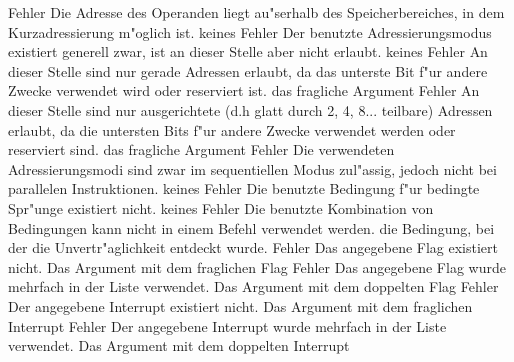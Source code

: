 \documentclass[12pt,a4paper,twoside]{report}
\begin{document}
\begin{description}
               {Fehler}
               {Die Adresse des Operanden liegt au"serhalb des
                Speicherbereiches, in dem Kurzadressierung m"oglich ist.}
               {keines}
               {Fehler}
               {Der benutzte Adressierungsmodus existiert
                generell zwar, ist an dieser Stelle aber nicht erlaubt.}
               {keines}
               {Fehler}
               {An dieser Stelle sind nur gerade Adressen erlaubt,
                da das unterste Bit f"ur andere Zwecke verwendet wird
                oder reserviert ist.}
               {das fragliche Argument}
               {Fehler}
               {An dieser Stelle sind nur ausgerichtete
                (d.h glatt durch 2, 4, 8... teilbare) Adressen erlaubt,
                da die untersten Bits f"ur andere Zwecke verwendet werden
                oder reserviert sind.}
               {das fragliche Argument}
               {Fehler}
               {Die verwendeten Adressierungsmodi
                sind zwar im sequentiellen Modus zul"assig, jedoch nicht
                bei parallelen Instruktionen.}
               {keines}
               {Fehler}
               {Die benutzte Bedingung f"ur bedingte Spr"unge
                existiert nicht.}
               {keines}
               {Fehler}
               {Die benutzte Kombination von Bedingungen kann nicht
                in einem Befehl verwendet werden.}
               {die Bedingung, bei der die Unvertr"aglichkeit
                entdeckt wurde.}
               {Fehler}
               {Das angegebene Flag existiert nicht.}
               {Das Argument mit dem fraglichen Flag}
               {Fehler}
               {Das angegebene Flag wurde mehrfach in der Liste verwendet.}
               {Das Argument mit dem doppelten Flag}
               {Fehler}
               {Der angegebene Interrupt existiert nicht.}
               {Das Argument mit dem fraglichen Interrupt}
               {Fehler}
               {Der angegebene Interrupt wurde mehrfach in der Liste verwendet.}
               {Das Argument mit dem doppelten Interrupt}

\end{description}
\end{document}
